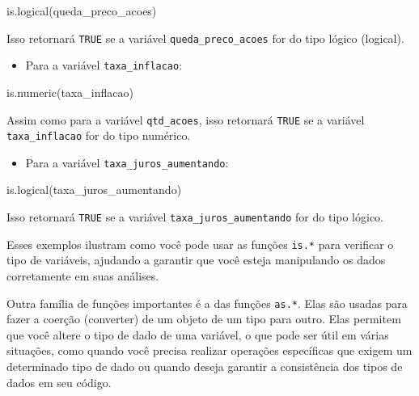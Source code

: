 \documentclass[
  portuguese,
  letterpaper,
  DIV=11,
  numbers=noendperiod]{scrreprt}
\newenvironment{Shaded}{\begin{snugshade}}{\end{snugshade}}
\newcommand{\FunctionTok}[1]{\textcolor[rgb]{0.28,0.35,0.67}{#1}}
\newcommand{\NormalTok}[1]{\textcolor[rgb]{0.00,0.23,0.31}{#1}}
\providecommand{\tightlist}{%
  \setlength{\itemsep}{0pt}\setlength{\parskip}{0pt}}
\theoremstyle{definition}
\theoremstyle{remark}
\begin{document}
\begin{Shaded}
\begin{Highlighting}[]
\FunctionTok{is.logical}\NormalTok{(queda\_preco\_acoes)}
\end{Highlighting}
\end{Shaded}

Isso retornará \texttt{TRUE} se a variável \texttt{queda\_preco\_acoes}
for do tipo lógico (logical).

\begin{itemize}
\tightlist
\item
  Para a variável \texttt{taxa\_inflacao}:
\end{itemize}

\begin{Shaded}
\begin{Highlighting}[]
\FunctionTok{is.numeric}\NormalTok{(taxa\_inflacao)}
\end{Highlighting}
\end{Shaded}

Assim como para a variável \texttt{qtd\_acoes}, isso retornará
\texttt{TRUE} se a variável \texttt{taxa\_inflacao} for do tipo
numérico.

\begin{itemize}
\tightlist
\item
  Para a variável \texttt{taxa\_juros\_aumentando}:
\end{itemize}

\begin{Shaded}
\begin{Highlighting}[]
\FunctionTok{is.logical}\NormalTok{(taxa\_juros\_aumentando)}
\end{Highlighting}
\end{Shaded}

Isso retornará \texttt{TRUE} se a variável
\texttt{taxa\_juros\_aumentando} for do tipo lógico.

Esses exemplos ilustram como você pode usar as funções \texttt{is.*}
para verificar o tipo de variáveis, ajudando a garantir que você esteja
manipulando os dados corretamente em suas análises.

Outra família de funções importantes é a das funções \texttt{as.*}. Elas
são usadas para fazer a coerção (converter) de um objeto de um tipo para
outro. Elas permitem que você altere o tipo de dado de uma variável, o
que pode ser útil em várias situações, como quando você precisa realizar
operações específicas que exigem um determinado tipo de dado ou quando
deseja garantir a consistência dos tipos de dados em seu código.
\end{document}
